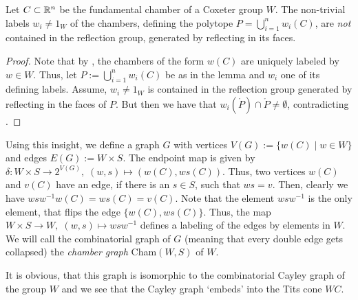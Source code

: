 \begin{lemma}
    Let \(C \subset \mathbb{R}^n\) be the fundamental chamber of a Coxeter group \(W\).
    The non-trivial labels \(w_i \neq 1_W\) of the chambers, defining the polytope \(P = \bigcup_{i=1}^n w_i(C)\), are \emph{not} contained in the reflection group, generated by reflecting in its faces.
\end{lemma}
\begin{proof}
    Note that by , the chambers of the form \(w(C)\) are uniquely labeled by \(w \in W\).
    Thus, let \(P := \bigcup_{i = 1}^n w_i(C)\) be as in the lemma and \(w_i\) one of its defining labels.
    Assume, \(w_i \neq 1_W\) is contained in the reflection group generated by reflecting in the faces of \(P\).
    But then we have that \(w_i(\mathring{P}) \cap \mathring{P} \neq \emptyset\), contradicting .
\end{proof}

Using this insight, we define a graph \(G\) with vertices \(V(G) := \{w(C) \;\vert\; w \in W\}\) and edges \(E(G) := W \times S\).
The endpoint map is given by \(\delta : W \times S \to 2^{V(G)},\; (w, s) \mapsto (w(C), ws(C))\).
Thus, two vertices \(w(C)\) and \(v(C)\) have an edge, if there is an \(s \in S\), such that \(ws = v\).
Then, clearly we have \(wsw^{-1}w(C) = ws(C) = v(C)\).
Note that the element \(wsw^{-1}\) is the only element, that flips the edge \(\{w(C), ws(C)\}\).
Thus, the map \(W \times S \to W, \; (w, s) \mapsto wsw^{-1}\) defines a labeling of the edges by elements in \(W\).
We will call the combinatorial graph of \(G\) (meaning that every double edge gets collapsed) the \emph{chamber graph} Cham\((W, S)\) of \(W\).

It is obvious, that this graph is isomorphic to the combinatorial Cayley graph of the group \(W\) and we see that the Cayley graph `embeds' into the Tits cone \(WC\).

